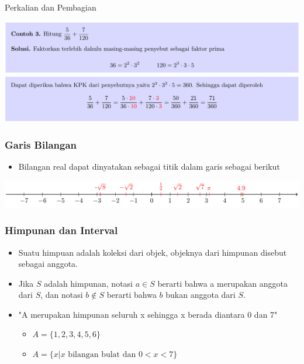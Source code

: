 \documentclass[pdflatex,compress,mathserif]{beamer}
\begin{document}
\begin{frame}{Perkalian dan Pembagian}
	\begin{center}
		\includegraphics[width=\linewidth]{img/img10}
		\includegraphics[width=\linewidth]{img/img11}
	\end{center}
\end{frame}

\begin{frame}
	\frametitle{Garis Bilangan}
	\begin{itemize}
		\item Bilangan real dapat dinyatakan sebagai titik dalam garis sebagai berikut
	\end{itemize}
	\begin{center}
		\includegraphics[width=\linewidth]{img/img12}
	\end{center}
\end{frame}

\begin{frame}
	\frametitle{Himpunan dan Interval}
	\begin{itemize}
		\item Suatu himpuan adalah koleksi dari objek, objeknya dari himpunan disebut sebagai anggota.
		\item Jika $S$ adalah himpunan, notasi $a \in S$ berarti bahwa a merupakan anggota dari $S$, dan notasi $b \notin S$ berarti bahwa $b$ bukan anggota dari $S$.
		\item "A merupakan himpunan seluruh x sehingga x berada diantara 0 dan 7"
		\begin{itemize}
			\item[] $A = \{1, 2, 3, 4, 5, 6\}$
			\item[] $A = \{x|x \text{ bilangan bulat dan } 0 < x < 7\}$
		\end{itemize}
	\end{itemize}
\end{frame}
\end{document}
